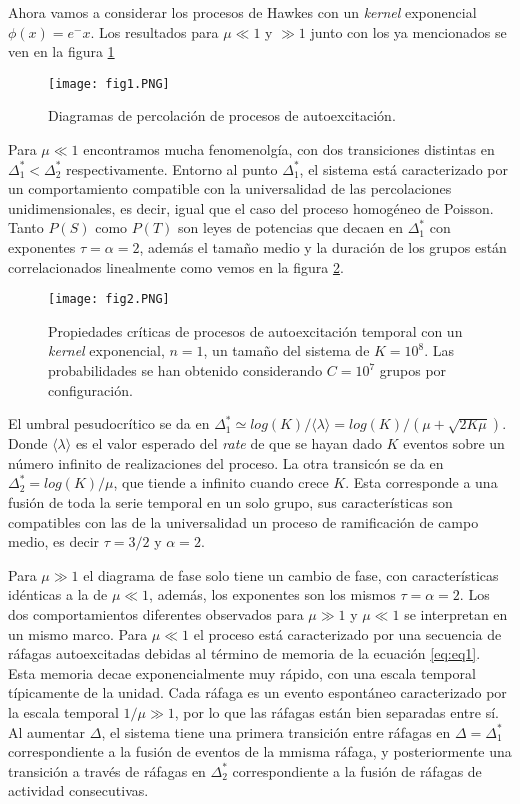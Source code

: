 \documentclass[a4paper,11pt]{book}
\begin{document}
Ahora vamos a considerar los procesos de Hawkes con un \textit{kernel} exponencial $\phi(x)=e^-x$. Los resultados para $\mu\ll1$ y $\gg1$ junto con los 
ya mencionados se ven en la figura \ref{f:fig1}

\begin{figure}[H]
\centering
\texttt{[image: fig1.PNG]}   
\caption{Diagramas de percolación de procesos de autoexcitación.}
\label{f:fig1} 
\end{figure}

Para $\mu\ll1$ encontramos mucha fenomenolgía, con dos transiciones distintas en $\Delta^*_1<\Delta^*_2$ respectivamente. Entorno al punto $\Delta^*_1$, 
el sistema está caracterizado por un comportamiento compatible con la universalidad de las percolaciones unidimensionales, es decir, igual que el caso 
del proceso homogéneo de Poisson. Tanto $P(S)$ como $P(T)$ son leyes de potencias que decaen en $\Delta^*_1$ con exponentes $\tau=\alpha=2$, además 
el tamaño medio y la duración de los grupos están correlacionados linealmente como vemos en la figura \ref{f:f2}.

\begin{figure}[H]
    \centering
    \texttt{[image: fig2.PNG]}   
    \caption{Propiedades críticas de procesos de autoexcitación temporal con un \textit{kernel} exponencial, $n=1$, un tamaño del sistema de $K=10^8$. Las 
    probabilidades se han obtenido considerando $C=10^7$ grupos por configuración.}
    \label{f:f2} 
\end{figure}

El umbral pesudocrítico se da en $\Delta^*_1\simeq log(K)/\langle \lambda\rangle=log(K)/(\mu+\sqrt{2K\mu})$. Donde $\langle \lambda\rangle$ es el valor 
esperado del \textit{rate} de que se hayan dado $K$ eventos sobre un número infinito de realizaciones del proceso. La otra transicón se da en 
$\Delta^*_2= log(K)/\mu$, que tiende a infinito cuando crece $K$. Esta corresponde a una fusión de toda la serie temporal en un solo grupo, sus características
son compatibles con las de la universalidad un proceso de ramificación de campo medio, es decir $\tau=3/2$ y $\alpha=2$.


Para $\mu\gg1$ el diagrama de fase solo tiene un cambio de fase, con características idénticas a la de $\mu\ll1$, además, los exponentes son los 
mismos $\tau=\alpha=2$. Los dos comportamientos diferentes observados para $\mu\gg1$ y $\mu\ll1$ se interpretan en un mismo marco. Para $\mu\ll1$
el proceso está caracterizado por una secuencia de ráfagas autoexcitadas debidas al término de memoria de la ecuación \ref{eq:eq1}. Esta memoria 
decae exponencialmente muy rápido, con una escala temporal típicamente de la unidad. Cada ráfaga es un evento espontáneo caracterizado por la 
escala temporal $1/\mu\gg1$, por lo que las ráfagas están bien separadas entre sí. Al aumentar $\Delta$, el sistema tiene una primera transición 
entre ráfagas en $\Delta=\Delta^*_1$ correspondiente a la fusión de eventos de la mmisma ráfaga, y posteriormente una transición a través
de ráfagas en $\Delta^*_2$ correspondiente a la fusión de ráfagas de actividad consecutivas. 
\end{document}
